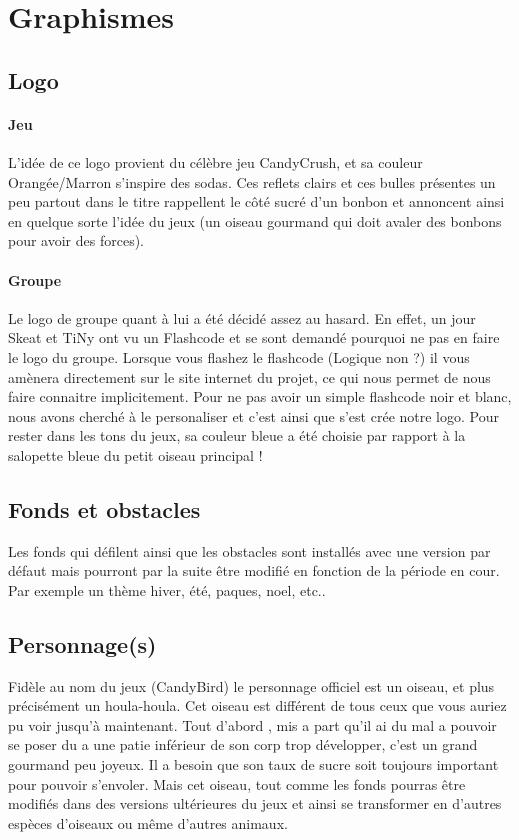 \documentclass [11pt]{report}
\begin{document}
	\section{Graphismes}
		\subsection {Logo}
			\paragraph{Jeu}
			L'idée de ce logo provient du célèbre jeu CandyCrush, et sa couleur Orangée/Marron s'inspire des sodas. Ces reflets clairs et ces bulles présentes un peu partout dans le titre rappellent le côté sucré d'un bonbon et annoncent ainsi en quelque sorte l'idée du jeux (un oiseau gourmand qui doit avaler des bonbons pour avoir des forces). 

			\paragraph{Groupe}
			Le logo de groupe quant à lui a été décidé assez au hasard. En effet, un jour Skeat et TiNy ont vu un Flashcode et se sont demandé pourquoi ne pas en faire le logo du groupe. Lorsque vous flashez le flashcode (Logique non ?) il vous amènera directement sur le site internet du projet, ce qui nous permet de nous faire connaitre implicitement. Pour ne pas avoir un simple flashcode noir et blanc, nous avons cherché à le personaliser et c'est ainsi que s'est crée notre logo. Pour rester dans les tons du jeux, sa couleur bleue a été choisie par rapport à la salopette bleue du petit oiseau principal !

		\subsection {Fonds et obstacles}
 		Les fonds qui défilent ainsi que les obstacles sont installés avec une version par défaut mais pourront par la suite être modifié en fonction de la période en cour. Par exemple un thème hiver, été, paques, noel, etc..\\\vspace{5mm}

		\subsection {Personnage(s)}
 		Fidèle au nom du jeux (CandyBird) le personnage officiel est un oiseau, et plus précisément un houla-houla.
 		Cet oiseau est différent de tous ceux que vous auriez pu voir jusqu'à maintenant. Tout d'abord , mis a part qu'il ai du mal a pouvoir se poser du a une patie inférieur de son corp trop développer, c'est un grand gourmand peu joyeux. Il a besoin que son taux de sucre soit toujours important pour pouvoir s'envoler. Mais cet oiseau, tout comme les fonds pourras être modifiés dans des versions ultérieures du jeux et ainsi se transformer en d'autres espèces d'oiseaux ou même d'autres animaux.\\\vspace{5mm}
\end{document}
